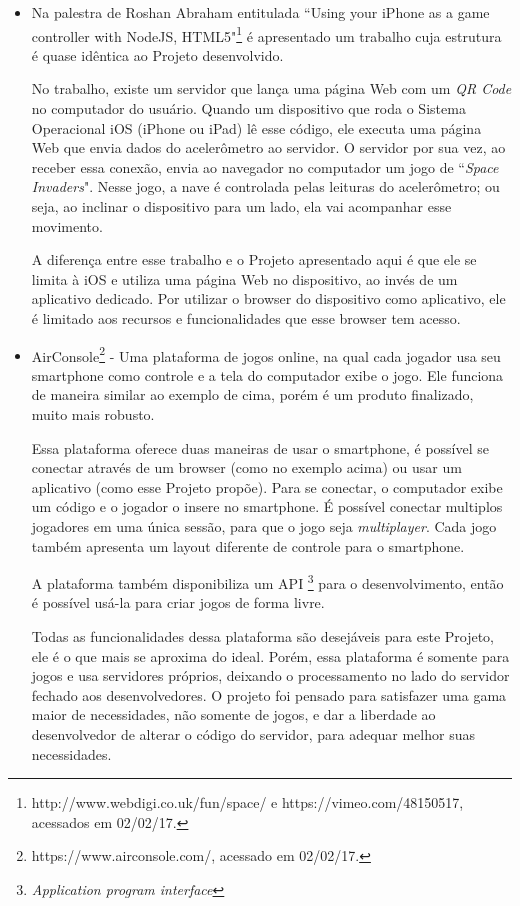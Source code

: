 \documentclass[a4paper,12pt]{article}
\begin{document}
\begin{itemize}

    \item Na palestra de Roshan Abraham entitulada “Using your iPhone as a game controller with NodeJS, HTML5"\footnote{http://www.webdigi.co.uk/fun/space/ e https://vimeo.com/48150517, acessados em 02/02/17.} é apresentado um trabalho cuja estrutura é quase idêntica ao Projeto desenvolvido.

    No trabalho, existe um servidor que lança uma página Web com um \emph{QR Code} no computador do usuário. Quando um dispositivo que roda o Sistema Operacional iOS (iPhone ou iPad) lê esse código, ele executa uma página Web que envia dados do acelerômetro ao servidor. O servidor por sua vez, ao receber essa conexão, envia ao navegador no computador um jogo de “\emph{Space Invaders}". Nesse jogo, a nave é controlada pelas leituras do acelerômetro; ou seja, ao inclinar o dispositivo para um lado, ela vai acompanhar esse movimento.

    A diferença entre esse trabalho e o Projeto apresentado aqui é que ele se limita à iOS e utiliza uma página Web no dispositivo, ao invés de um aplicativo dedicado. Por utilizar o browser do dispositivo como aplicativo, ele é limitado aos recursos e funcionalidades que esse browser tem acesso.

    \item AirConsole\footnote{https://www.airconsole.com/, acessado em 02/02/17.} - Uma plataforma de jogos online, na qual cada jogador usa seu smartphone como controle e a tela do computador exibe o jogo. Ele funciona de maneira similar ao exemplo de cima, porém é um produto finalizado, muito mais robusto.

    Essa plataforma oferece duas maneiras de usar o smartphone, é possível se conectar através de um browser (como no exemplo acima) ou usar um aplicativo (como esse Projeto propõe). Para se conectar, o computador exibe um código e o jogador o insere no smartphone. É possível conectar multiplos jogadores em uma única sessão, para que o jogo seja \emph{multiplayer}. Cada jogo também apresenta um layout diferente de controle para o smartphone.

    A plataforma também disponibiliza um API \footnote{\emph{Application program interface}} para o desenvolvimento, então é possível usá-la para criar jogos de forma livre.

    Todas as funcionalidades dessa plataforma são desejáveis para este Projeto, ele é o que mais se aproxima do ideal. Porém, essa plataforma é somente para jogos e usa servidores próprios, deixando o processamento no lado do servidor fechado aos desenvolvedores. O projeto foi pensado para satisfazer uma gama maior de necessidades, não somente de jogos, e dar a liberdade ao desenvolvedor de alterar o código do servidor, para adequar melhor suas necessidades.

\end{itemize}
\end{document}
